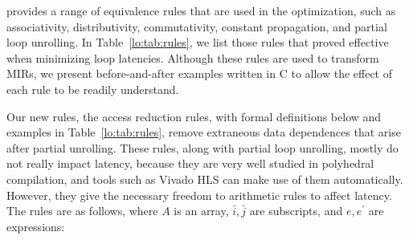 \SOAP{} provides a range of equivalence rules that are used in the
optimization, such as associativity, distributivity, commutativity, constant
propagation, and partial loop unrolling.  In Table~\ref{lo:tab:rules}, we list
those rules that proved effective when minimizing loop latencies.  Although
these rules are used to transform MIRs, we present before-and-after examples
written in C to allow the effect of each rule to be readily understand.

Our new rules, the access reduction rules, with formal definitions below and
examples in Table~\ref{lo:tab:rules}, remove extraneous data dependences that
arise after partial unrolling.  These rules, along with partial loop unrolling,
mostly do not really impact latency, because they are very well studied in
polyhedral compilation, and tools such as Vivado HLS can make use of them
automatically.  However, they give the necessary freedom to arithmetic rules
to affect latency.  The rules are as follows, where $A$ is an array, $\bar{i},
\bar{j}$ are subscripts, and $e, e^\prime$ are expressions:

